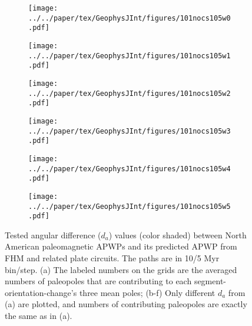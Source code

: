 \begin{figure}[!ht]
  \captionsetup[subfigure]{singlelinecheck=off,justification=raggedright,aboveskip=-6pt,belowskip=-6pt}
  \centering
  \begin{subfigure}{.495\textwidth}
    \texttt{[image: ../../paper/tex/GeophysJInt/figures/101nocs105w0.pdf]}
    \caption{}\label{fig-na-daw0}
  \end{subfigure}
  \vspace{.1em}
  \begin{subfigure}{.495\textwidth}
    \texttt{[image: ../../paper/tex/GeophysJInt/figures/101nocs105w1.pdf]}
    \caption{}\label{fig-na-daw1}
  \end{subfigure}
  \vspace{.1em}
  \begin{subfigure}{.495\textwidth}
    \texttt{[image: ../../paper/tex/GeophysJInt/figures/101nocs105w2.pdf]}
    \caption{}\label{fig-na-daw2}
  \end{subfigure}
  \vspace{.1em}
  \begin{subfigure}{.495\textwidth}
    \texttt{[image: ../../paper/tex/GeophysJInt/figures/101nocs105w3.pdf]}
    \caption{}\label{fig-na-daw3}
  \end{subfigure}
  \vspace{.1em}
  \begin{subfigure}{.495\textwidth}
    \texttt{[image: ../../paper/tex/GeophysJInt/figures/101nocs105w4.pdf]}
    \caption{}\label{fig-na-daw4}
  \end{subfigure}
  \vspace{.1em}
  \begin{subfigure}{.495\textwidth}
    \texttt{[image: ../../paper/tex/GeophysJInt/figures/101nocs105w5.pdf]}
    \caption{}\label{fig-na-daw5}
  \end{subfigure}
  \caption[$d_a$ of each pair of segment-oreintation-changes for North American
    10/5 Myr APWPs]{Tested angular difference ($d_a$) values (color shaded)
    between North American paleomagnetic APWPs and its predicted APWP from FHM
    and related plate circuits. The paths are in 10/5 Myr bin/step. (a) The
    labeled numbers on the grids are the averaged numbers of paleopoles that are
    contributing to each segment-orientation-change's three mean poles; (b-f)
    Only different $d_a$ from (a) are plotted, and numbers of contributing
    paleopoles are exactly the same as in (a).}\label{fig-nada}
\end{figure}
